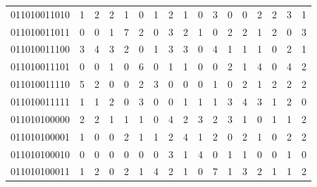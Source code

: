 \documentclass[10pt,a4paper]{article}
\begin{document}
\begin{longtable}{ |c|c|c|c|c|c|c|c|c|c|c|c|c|c|c|c|c| }
    011010011010              & 1                            & 2                                & 2                            & 1                              & 0   & 1   & 2   & 1   & 0   & 3   & 0   & 0   & 2   & 2   & 3   & 1   \\
    011010011011              & 0                            & 0                                & 1                            & 7                              & 2   & 0   & 3   & 2   & 1   & 0   & 2   & 2   & 1   & 2   & 0   & 3   \\
    011010011100              & 3                            & 4                                & 3                            & 2                              & 0   & 1   & 3   & 3   & 0   & 4   & 1   & 1   & 1   & 0   & 2   & 1   \\
    011010011101              & 0                            & 0                                & 1                            & 0                              & 6   & 0   & 1   & 1   & 0   & 0   & 2   & 1   & 4   & 0   & 4   & 2   \\
    011010011110              & 5                            & 2                                & 0                            & 0                              & 2   & 3   & 0   & 0   & 0   & 1   & 0   & 2   & 1   & 2   & 2   & 2   \\
    011010011111              & 1                            & 1                                & 2                            & 0                              & 3   & 0   & 0   & 1   & 1   & 1   & 3   & 4   & 3   & 1   & 2   & 0   \\
    011010100000              & 2                            & 2                                & 1                            & 1                              & 1   & 0   & 4   & 2   & 3   & 2   & 3   & 1   & 0   & 1   & 1   & 2   \\
    011010100001              & 1                            & 0                                & 0                            & 2                              & 1   & 1   & 2   & 4   & 1   & 2   & 0   & 2   & 1   & 0   & 2   & 2   \\
    011010100010              & 0                            & 0                                & 0                            & 0                              & 0   & 0   & 3   & 1   & 4   & 0   & 1   & 1   & 0   & 0   & 1   & 0   \\
    011010100011              & 1                            & 2                                & 0                            & 2                              & 1   & 4   & 2   & 1   & 0   & 7   & 1   & 3   & 2   & 1   & 1   & 2   \\

\end{longtable}
\end{document}
